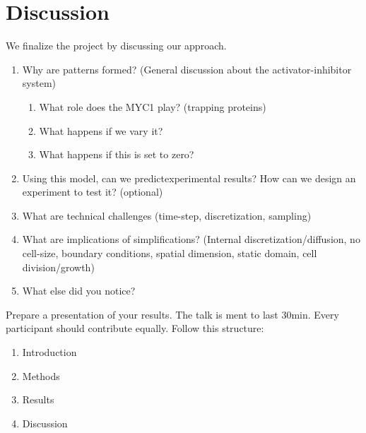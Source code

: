 \section{Discussion}
We finalize the project by discussing our approach.
\begin{enumerate}
    \item Why are patterns formed? (General discussion about the activator-inhibitor system)
    \begin{enumerate}
        \item What role does the MYC1 play? (trapping proteins)
        \item What happens if we vary it?
        \item What happens if this is set to zero?
    \end{enumerate}
    \item Using this model, can we predictexperimental results?
    How can we design an experiment to test it? (optional)
    \item What are technical challenges (time-step, discretization, sampling)
    \item What are implications of simplifications? (Internal discretization/diffusion, no cell-size, boundary conditions, spatial dimension, static domain, cell division/growth)
    \item What else did you notice?
\end{enumerate}
%
%
Prepare a presentation of your results.
The talk is ment to last 30min.
Every participant should contribute equally.
Follow this structure:
\begin{enumerate}
    \item Introduction
    \item Methods
    \item Results
    \item Discussion
\end{enumerate}